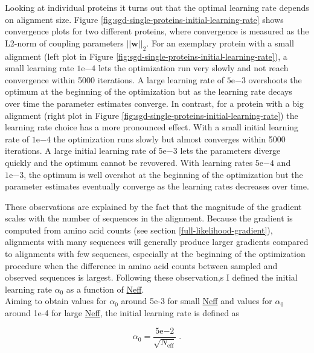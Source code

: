 \documentclass[12pt,a4paper,twoside]{book}
\newcommand{\w}{\mathbf{w}}
\theoremstyle{definition}
\theoremstyle{definition}
\theoremstyle{remark}
\begin{document}
Looking at individual proteins it turns out that the optimal learning
rate depends on alignment size. Figure
\ref{fig:sgd-single-proteins-initial-learning-rate} shows convergence
plots for two different proteins, where convergence is measured as the
L2-norm of coupling parameters \(||\w||_2\). For an exemplary protein
with a small alignment (left plot in Figure
\ref{fig:sgd-single-proteins-initial-learning-rate}), a small learning
rate \(1\mathrm{e}{-4}\) lets the optimization run very slowly and not
reach convergence within 5000 iterations. A large learning rate of
\(5\mathrm{e}{-3}\) overshoots the optimum at the beginning of the
optimization but as the learning rate decays over time the parameter
estimates converge. In contrast, for a protein with a big alignment
(right plot in Figure
\ref{fig:sgd-single-proteins-initial-learning-rate}) the learning rate
choice has a more pronounced effect. With a small initial learning rate
of \(1\mathrm{e}{-4}\) the optimization runs slowly but almost converges
within 5000 iterations. A large initial learning rate of
\(5\mathrm{e}{-3}\) lets the parameters diverge quickly and the optimum
cannot be revovered. With learning rates \(5\mathrm{e}{-4}\) and
\(1\mathrm{e}{-3}\), the optimum is well overshot at the beginning of
the optimization but the parameter estimates eventually converge as the
learning rates decreases over time.

These observations are explained by the fact that the magnitude of the
gradient scales with the number of sequences in the alignment. Because
the gradient is computed from amino acid counts (see section
\ref{full-likelihood-gradient}), alignments with many sequences will
generally produce larger gradients compared to alignments with few
sequences, especially at the beginning of the optimization procedure
when the difference in amino acid counts between sampled and observed
sequences is largest. Following these observation,s I defined the
initial learning rate \(\alpha_0\) as a function of
\protect\hyperlink{abbrev}{Neff}.\\
Aiming to obtain values for \(\alpha_0\) around 5e-3 for small
\protect\hyperlink{abbrev}{Neff} and values for \(\alpha_0\) around 1e-4
for large \protect\hyperlink{abbrev}{Neff}, the initial learning rate is
defined as

\begin{equation}
  \alpha_0 = \frac{5\mathrm{e}{-2}}{\sqrt{N_{\text{eff}}}} \; .
  \label{eq:learning-rate-wrt-neff}
\end{equation}
\end{document}
